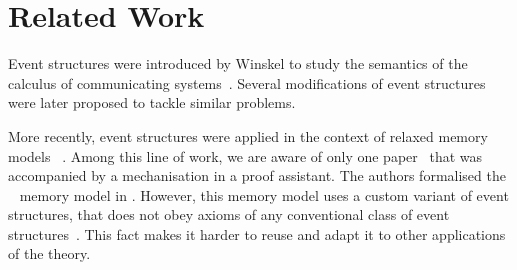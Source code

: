 \section{Related Work}

Event structures were introduced by Winskel to study the semantics of 
the calculus of communicating systems~\cite{Winskel:86, Winskel:82}. 
Several modifications of event structures~\cite{Langerak:91, Boudol-Castellani:1991}
were later proposed to tackle similar problems.  
 
More recently, event structures were applied 
in the context of relaxed memory models~%
\cite{Jeffrey-Riely:LICS16, PichonPharabod-Sewell:POPL16, Chakraborty-Vafeiadis:POPL19, Moiseenko-al:ECOOP20}.
Among this line of work, we are aware of only one paper~\cite{Moiseenko-al:ECOOP20}
that was accompanied by a mechanisation in a proof assistant. 
The authors formalised the \weakestmo~\cite{Chakraborty-Vafeiadis:POPL19} 
memory model in \coq. However, this memory model uses 
a custom variant of event structures, that does not 
obey axioms of any conventional class of 
event structures~\cite{Winskel:82, Langerak:91, Boudol-Castellani:1991}. 
This fact makes it harder to reuse and adapt it 
to other applications of the theory. 

